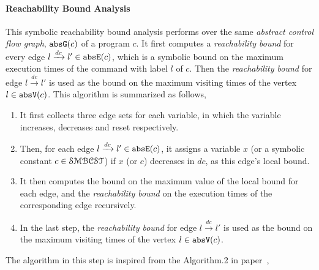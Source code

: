 \paragraph{Reachability Bound Analysis}
This symbolic reachability bound analysis performs over the same \emph{abstract control flow graph}, $\mathtt{abs}{\mathtt{G}}(c)$ of a program $c$. 
It first computes a \emph{reachability bound} for every edge $l \xrightarrow{dc} l' \in \mathtt{abs}{\mathtt{E}}(c)$,
which is a symbolic bound on the maximum execution times of the command with label $l$ of $c$.
Then the \emph{reachability bound} for edge $l \xrightarrow{dc} l'$ is used as the bound on the maximum visiting times of the vertex $l \in \mathtt{abs}{\mathtt{V}}(c)$.
This algorithm is summarized as follows,
\begin{enumerate}
  \item It first collects three edge sets for each variable,
in which the variable increases, decreases and reset respectively.
\item
Then, for each edge  $l \xrightarrow{dc} l' \in \mathtt{abs}{\mathtt{E}}(c)$, it assigns a variable $x$ (or a symbolic constant $c \in \mathcal{SMBCST}$) if $x$ (or $c$) decreases in $dc$, as this edge's local bound.
\item
It then computes the bound on the maximum value of the local bound for each edge,
and the \emph{reachability bound} on the execution
times of the corresponding edge recursively.
\item In the last step, the \emph{reachability bound} for edge $l \xrightarrow{dc} l'$ is used as the bound on the maximum visiting times of the vertex $l \in \mathtt{abs}{\mathtt{V}}(c)$.
\end{enumerate}
The algorithm in this step is inspired from the Algorithm.2 in paper~\cite{SinnZV14},
